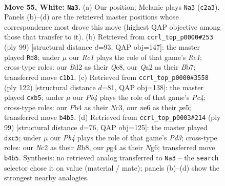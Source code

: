 \documentclass[11pt]{article}
\begin{document}
\clearpage

\begin{figure}[p]\centering
\begin{subfigure}{0.46\textwidth}\centering
\resizebox{\linewidth}{!}{%
\newchessgame
\chessboard[
  setfen={nrq3k1/4br2/p3n3/P1p2p1p/1P1p1Pp1/6P1/QRNBP2P/2RN2K1 w - - 1 55},
  showmover=false,
  pgfstyle=straightmove, color=movearrow, markmove={c2-a3}
]}
\caption{}
\end{subfigure}\hfill
\begin{subfigure}{0.46\textwidth}\centering
\resizebox{\linewidth}{!}{%
\newchessgame
\chessboard[
  setfen={2r1q1k1/1br2pp1/1p2n2p/p1ppN2P/3P1P2/1P2P1PB/P1R1Q2K/2R5 b - - 34 50},
  showmover=false,
  pgfstyle=straightmove, color=movearrow, markmove={c8-d8}
]}
\caption{}
\end{subfigure}
\\[4pt]
\begin{subfigure}{0.46\textwidth}\centering
\resizebox{\linewidth}{!}{%
\newchessgame
\chessboard[
  setfen={r7/r2qnkb1/1p1p2p1/1ppPp1Pp/P1P1P3/2N2PQ1/2KB4/R4R2 w - - 0 62},
  showmover=false,
  pgfstyle=straightmove, color=movearrow, markmove={c4-b5}
]}
\caption{}
\end{subfigure}\hfill
\begin{subfigure}{0.46\textwidth}\centering
\resizebox{\linewidth}{!}{%
\newchessgame
\chessboard[
  setfen={1rqr4/4bp1k/1p1p2np/pPP1p3/4Pp2/NP1R1P1P/4QBP1/3R3K b - - 0 50},
  showmover=false,
  pgfstyle=straightmove, color=movearrow, markmove={d6-c5}
]}
\caption{}
\end{subfigure}
\caption{\textbf{Move 55, White: \texttt{Na3}.} (a) Our position; Melanie plays \texttt{Na3} (\texttt{c2a3}). Panels (b)--(d) are the retrieved master positions whose correspondence most drove this move (highest QAP objective among those that transfer to it). (b) Retrieved from \texttt{ccrl\_top\_p0000\#253} (ply 99) [structural distance $d$=93, QAP obj=147]: the master played \texttt{Rd8}; under $\mu$ our \emph{Rc1} plays the role of that game's \emph{Rc1}; cross-type roles: our \emph{B}d2 as their \emph{Q}e8, our \emph{Q}a2 as their \emph{B}b7; transferred move \texttt{c1b1}. (c) Retrieved from \texttt{ccrl\_top\_p0000\#3558} (ply 122) [structural distance $d$=81, QAP obj=138]: the master played \texttt{cxb5}; under $\mu$ our \emph{Pb4} plays the role of that game's \emph{Pc4}; cross-type roles: our \emph{P}b4 as their \emph{N}c3, our \emph{n}e6 as their \emph{p}e5; transferred move \texttt{b4b5}. (d) Retrieved from \texttt{ccrl\_top\_p0003\#214} (ply 99) [structural distance $d$=76, QAP obj=125]: the master played \texttt{dxc5}; under $\mu$ our \emph{Pb4} plays the role of that game's \emph{Pd3}; cross-type roles: our \emph{N}c2 as their \emph{R}b8, our \emph{p}g4 as their \emph{N}g6; transferred move \texttt{b4b5}. Synthesis: no retrieved analog transferred to \texttt{Na3} -- the \texttt{search} selector chose it on value (material / mate); panels (b)--(d) show the strongest nearby analogies.}
\label{fig:thought-m108}
\end{figure}
\end{document}

